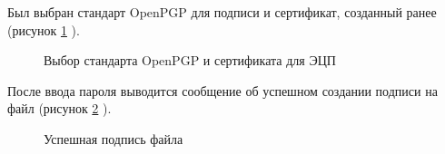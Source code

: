 \documentclass[10pt,a4paper]{report}
\begin{document}
Был выбран стандарт OpenPGP для подписи и сертификат, созданный ранее (рисунок \ref{ris:image4} ).\\
\begin{figure}[h]	
\caption{Выбор стандарта OpenPGP и сертификата для ЭЦП}
\label{ris:image4}
\end{figure}
\pagebreak
После ввода пароля выводится сообщение об успешном создании подписи на файл (рисунок \ref{ris:image5} ).
\begin{figure}[h]	
\caption{Успешная подпись файла}
\label{ris:image5}
\end{figure}
\newpage
\end{document}
